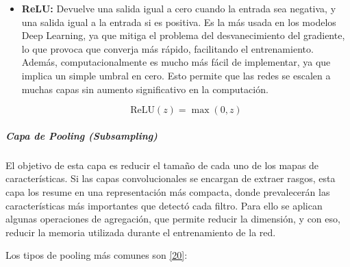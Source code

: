 \documentclass[11pt, a4paper]{article}
\numberwithin{equation}{section}
\begin{document}
\begin{itemize}
\begin{equation}
\label{eq:softmax}
\sigma(z)_i = \frac{e^{z_i}}{\sum_{j=1}^{K} e^{z_j}}
\end{equation}

\item \textbf{ReLU:} Devuelve una salida igual a cero cuando la entrada sea negativa, y una salida igual a la entrada si es positiva. Es la más usada en los modelos Deep Learning, ya que mitiga el problema del desvanecimiento del gradiente, lo que provoca que converja más rápido, facilitando el entrenamiento. Además, computacionalmente es mucho más fácil de implementar, ya que implica un simple umbral en cero. Esto permite que las redes se escalen a muchas capas sin aumento significativo en la computación.

\begin{equation}
\label{eq:relu}
\text{ReLU}(z) = \max(0, z)
\end{equation}
\end{itemize}

\subparagraph{Capa de Pooling (Subsampling)}

El objetivo de esta capa es reducir el tamaño de cada uno de los mapas de características. Si las capas convolucionales se encargan de extraer rasgos, esta capa los resume en una representación más compacta, donde prevalecerán las características más importantes que detectó cada filtro. Para ello se aplican algunas operaciones de agregación, que permite reducir la dimensión, y con eso, reducir la memoria utilizada durante el entrenamiento de la red.

Los tipos de pooling más comunes son \hyperlink{ref:20}{[20]}:
\end{document}
